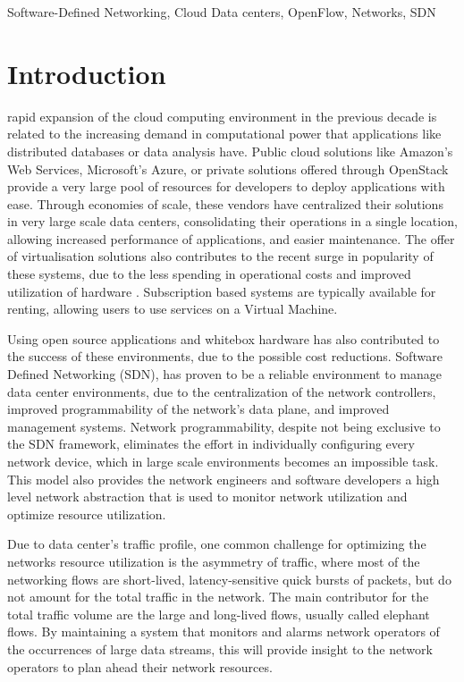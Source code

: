 \documentclass[a4paper]{IEEEtran}
\begin{document}
\begin{IEEEkeywords}
Software-Defined Networking, Cloud Data centers, OpenFlow, Networks, SDN
\end{IEEEkeywords}

\section{Introduction}

 rapid expansion of the cloud computing environment in the previous decade is related to the increasing demand in computational power that 
applications like distributed databases or data analysis have. Public cloud solutions like Amazon's Web Services, Microsoft's Azure, or private solutions offered
through OpenStack provide a very large pool of resources for developers to deploy applications with ease. Through economies of scale, these vendors have
centralized their solutions in very large scale data centers, consolidating their operations in a single location, allowing increased performance of applications, and
easier maintenance. The offer of virtualisation solutions also contributes to the recent surge in popularity of these systems, due to the less spending in
operational costs and improved utilization of hardware \cite{sims_david_carousels_2011}. Subscription based systems are typically available for renting, allowing 
users to use services on a Virtual Machine.

\par Using open source applications and whitebox hardware has also contributed to the success of these environments, due to the possible cost reductions. Software
Defined Networking (SDN), has proven to be a reliable environment to manage data center environments, due to the centralization of the network
controllers, improved programmability of the network's data plane, and improved management systems. Network programmability, despite not being exclusive to the 
SDN framework, eliminates the effort in individually configuring every network device, which in large scale environments becomes an impossible task. This model
also provides the network engineers and software developers a high level network abstraction that is used to monitor network utilization and optimize resource
utilization.

\par Due to data center's traffic profile, one common challenge for optimizing the networks resource utilization
is the asymmetry of traffic, where most of the networking flows are short-lived, latency-sensitive quick bursts of packets, but do not amount for the total traffic 
in the network. The main contributor for the total traffic volume are the large and long-lived flows, usually called elephant flows. By maintaining a system that
monitors and alarms network operators of the occurrences of large data streams, this will provide insight to the network operators to plan ahead their network 
resources.
\end{document}

